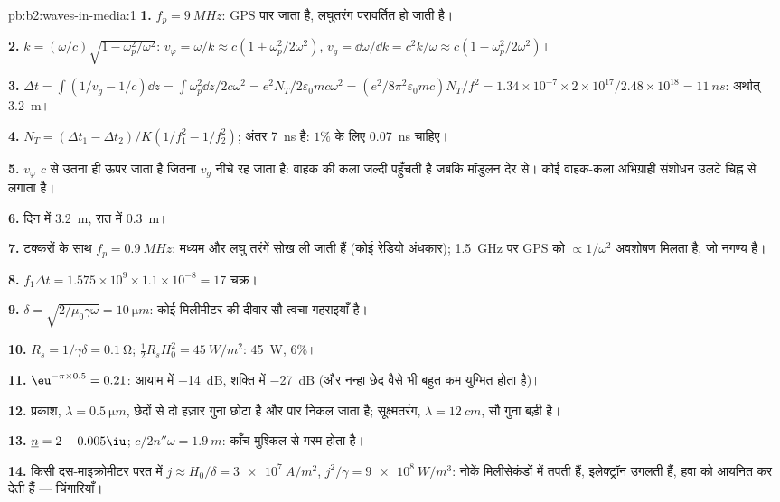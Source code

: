 \begin{solution}{pb:b2:waves-in-media:1}
\textbf{1.} $f_p = \qty{9}{MHz}$: GPS पार जाता है, लघुतरंग परावर्तित हो जाती है।

\textbf{2.} $k = (\omega/c)\sqrt{1 - \omega_p^2/\omega^2}$: $v_\varphi = \omega/k \approx c(1 + \omega_p^2/
2\omega^2)$, $v_g = \dd\omega/\dd k = c^2k/\omega \approx c(1 - \omega_p^2/2\omega^2)$।

\textbf{3.} $\Delta t = \int(1/v_g - 1/c)\dd z = \int\omega_p^2\dd z/2c\omega^2 = e^2N_T/2\varepsilon_0
mc\omega^2 = (e^2/8\pi^2\varepsilon_0mc)N_T/f^2 = 1.34 \times 10^{-7} \times 2 \times 10^{17}/2.48 \times
10^{18} = \qty{11}{ns}$: अर्थात् \qty{3.2}{m}।

\textbf{4.} $N_T = (\Delta t_1 - \Delta t_2)/K(1/f_1^2 - 1/f_2^2)$; अंतर
\qty{7}{ns} है: $1\%$ के लिए \qty{0.07}{ns} चाहिए।

\textbf{5.} $v_\varphi$ $c$ से उतना ही ऊपर जाता है जितना $v_g$ नीचे रह जाता है:
वाहक की कला जल्दी पहुँचती है जबकि मॉडुलन देर से। कोई
वाहक-कला अभिग्राही संशोधन उलटे चिह्न से लगाता है।

\textbf{6.} दिन में \qty{3.2}{m}, रात में \qty{0.3}{m}।

\textbf{7.} टक्करों के साथ $f_p = \qty{0.9}{MHz}$: मध्यम और लघु तरंगें
सोख ली जाती हैं (कोई रेडियो अंधकार); \qty{1.5}{GHz} पर GPS को
$\propto 1/\omega^2$ अवशोषण मिलता है, जो नगण्य है।

\textbf{8.} $f_1\Delta t = 1.575 \times 10^9 \times 1.1 \times 10^{-8} = 17$ चक्र।

\textbf{9.} $\delta = \sqrt{2/\mu_0\gamma\omega} = \qty{10}{\micro m}$: कोई मिलीमीटर की दीवार
सौ त्वचा गहराइयाँ है।

\textbf{10.} $R_s = 1/\gamma\delta = \qty{0.1}{\ohm}$; $\tfrac12R_sH_0^2 = \qty{45}{W/m^2}$: \qty{45}{W},
$6\%$।

\textbf{11.} $\eu^{-\pi \times 0.5} = 0.21$: आयाम में \qty{-14}{dB}, शक्ति में
\qty{-27}{dB} (और नन्हा छेद वैसे भी बहुत कम युग्मित होता है)।

\textbf{12.} प्रकाश, $\lambda = \qty{0.5}{\micro m}$, छेदों से दो हज़ार गुना छोटा
है और पार निकल जाता है; सूक्ष्मतरंग, $\lambda = \qty{12}{cm}$, सौ गुना
बड़ी है।

\textbf{13.} $\underline n = 2 - 0.005\iu$; $c/2n''\omega = \qty{1.9}{m}$: काँच मुश्किल से
गरम होता है।

\textbf{14.} किसी दस-माइक्रोमीटर परत में $j \approx H_0/\delta = \qty{3e7}{A/m^2}$,
$j^2/\gamma = \qty{9e8}{W/m^3}$: नोकें मिलीसेकंडों में तपती हैं, इलेक्ट्रॉन उगलती हैं,
हवा को आयनित कर देती हैं --- चिंगारियाँ।


\end{solution}
